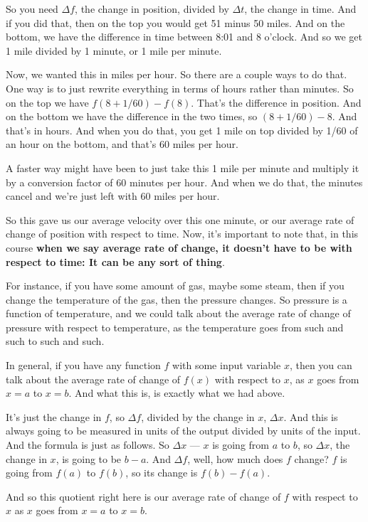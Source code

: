 \documentclass[pdftex, brazil, 12pt, twoside]{article}
\begin{document}
So you need $\Delta f$, the change in position,
divided by $\Delta t$, the change in time.
And if you did that, then on the top
you would get 51 minus 50 miles.
And on the bottom, we have the difference
in time between 8:01 and 8 o'clock.
And so we get 1 mile divided by 1 minute, or 1 mile per minute.

Now, we wanted this in miles per hour.
So there are a couple ways to do that.
One way is to just rewrite everything in terms of hours
rather than minutes.
So on the top we have $f(8 + 1/60) - f(8)$.
That's the difference in position.
And on the bottom we have the difference in the two
times, so $(8 + 1/60) - 8$.
And that's in hours.
And when you do that, you get 1 mile
on top divided by 1/60 of an hour on the bottom,
and that's 60 miles per hour.

A faster way might have been to just take
this 1 mile per minute and multiply it by a conversion
factor of 60 minutes per hour.
And when we do that, the minutes cancel
and we're just left with 60 miles per hour.

So this gave us our average velocity over this one minute,
or our average rate of change of position with respect to time.
Now, it's important to note that, in this course \textbf{when
we say average rate of change, it doesn't have to be with respect to time:
It can be any sort of thing}.

For instance, if you have some amount of gas, maybe
some steam, then if you change the temperature of the gas,
then the pressure changes.
So pressure is a function of temperature,
and we could talk about the average rate of change
of pressure with respect to temperature,
as the temperature goes from such and such to such and such.

In general, if you have any function $f$ with some input
variable $x$, then you can talk about the average rate
of change of $f(x)$ with respect to $x$, as $x$ goes
from $x = a$ to $x = b$.
And what this is, is exactly what we had above.

It's just the change in $f$, so $\Delta
f$, divided by the change in $x$, $\Delta x$.
And this is always going to be measured
in units of the output divided by units of the input.
And the formula is just as follows.
So $\Delta x$ --- $x$ is going from $a$ to $b$,
so $\Delta x$, the change in $x$, is going to be $b - a$.
And $\Delta f$, well, how much does $f$ change?
$f$ is going from $f(a)$ to $f(b)$, so its change is
$f(b) - f(a)$.

And so this quotient right here is our average rate
of change of $f$ with respect to $x$ as $x$ goes from $x = a$
to $x = b$.
\end{document}
